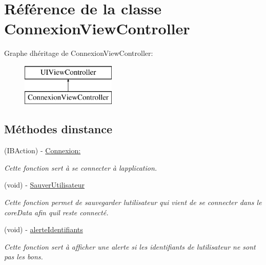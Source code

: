 \hypertarget{interface_connexion_view_controller}{}\section{Référence de la classe Connexion\+View\+Controller}
\label{interface_connexion_view_controller}
Graphe d\textquotesingle{}héritage de Connexion\+View\+Controller\+:\begin{figure}[H]
\begin{center}
\leavevmode
\includegraphics[height=2.000000cm]{interface_connexion_view_controller}
\end{center}
\end{figure}
\subsection*{Méthodes d\textquotesingle{}instance}
\begin{DoxyCompactItemize}
\item 
(I\+B\+Action) -\/ \hyperlink{interface_connexion_view_controller_a32b03e9bd1681e7fe79d34ade1ae81b0}{Connexion\+:}
\begin{DoxyCompactList}\small\item\em Cette fonction sert à se connecter à l\textquotesingle{}application. \end{DoxyCompactList}\item 
\hypertarget{interface_connexion_view_controller_af4f20a984df6e604478ba44c64b5a158}{}(void) -\/ \hyperlink{interface_connexion_view_controller_af4f20a984df6e604478ba44c64b5a158}{Sauver\+Utilisateur}\label{interface_connexion_view_controller_af4f20a984df6e604478ba44c64b5a158}

\begin{DoxyCompactList}\small\item\em Cette fonction permet de sauvegarder l\textquotesingle{}utilisateur qui vient de se connecter dans le core\+Data afin qu\textquotesingle{}il reste connecté. \end{DoxyCompactList}\item 
\hypertarget{interface_connexion_view_controller_abc4a3a44cabe67109438c8b6731f1346}{}(void) -\/ \hyperlink{interface_connexion_view_controller_abc4a3a44cabe67109438c8b6731f1346}{alerte\+Identifiants}\label{interface_connexion_view_controller_abc4a3a44cabe67109438c8b6731f1346}

\begin{DoxyCompactList}\small\item\em Cette fonction sert à afficher une alerte si les identifiants de l\textquotesingle{}utilisateur ne sont pas les bons. \end{DoxyCompactList}\end{DoxyCompactItemize}
